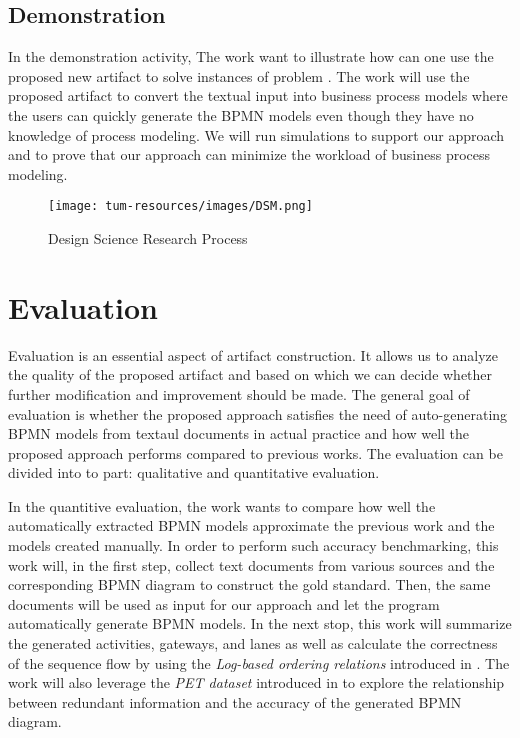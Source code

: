 \subsection{Demonstration}
In the demonstration activity, The work want to illustrate how can one use the proposed new artifact to solve instances of problem \cite{DSM_3}. The work will use the proposed artifact to convert the textual input into business process models where the users can quickly generate the BPMN models even though they have no knowledge of process modeling. We will run simulations to support our approach and to prove that our approach can minimize the workload of business process modeling.

\begin{figure}[h]
    \centering
    \caption{Design Science Research Process}
    \texttt{[image: tum-resources/images/DSM.png]}
\end{figure}

\section{Evaluation}
\label{sec:intro:ev}

Evaluation is an essential aspect of artifact construction. It allows us to analyze the quality of the proposed artifact and based on which we can decide whether further modification and improvement should be made. The general goal of evaluation is whether the proposed approach satisfies the need of auto-generating BPMN models from textaul documents in actual practice and how well the proposed approach performs compared to previous works. The evaluation can be divided into to part: qualitative and quantitative evaluation.

In the quantitive evaluation, the work wants to compare how well the automatically extracted BPMN models approximate the previous work \cite{t2m_1_main} and the models created manually. In order to perform such accuracy benchmarking, this work will, in the first step, collect text documents from various sources and the corresponding BPMN diagram to construct the gold standard. Then, the same documents will be used as input for our approach and let the program automatically generate BPMN models. In the next stop, this work will summarize the generated activities, gateways, and lanes as well as calculate the correctness of the sequence flow by using the \textit{Log-based ordering relations} introduced in \cite{eva_02}. The work will also leverage the \textit{PET dataset} introduced in \cite{pet_dataset} to explore the relationship between redundant information and the accuracy of the generated BPMN diagram.

